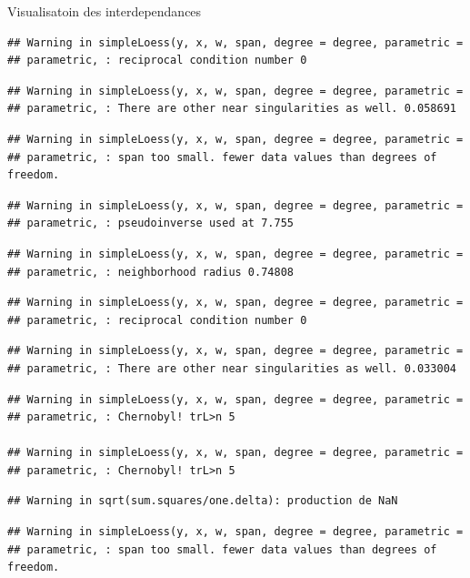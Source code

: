 \documentclass[11pt,ignorenonframetext,]{beamer}
\begin{document}
\begin{frame}[fragile]{Visualisatoin des interdependances}
\begin{verbatim}
## Warning in simpleLoess(y, x, w, span, degree = degree, parametric =
## parametric, : reciprocal condition number 0
\end{verbatim}

\begin{verbatim}
## Warning in simpleLoess(y, x, w, span, degree = degree, parametric =
## parametric, : There are other near singularities as well. 0.058691
\end{verbatim}

\begin{verbatim}
## Warning in simpleLoess(y, x, w, span, degree = degree, parametric =
## parametric, : span too small. fewer data values than degrees of freedom.
\end{verbatim}

\begin{verbatim}
## Warning in simpleLoess(y, x, w, span, degree = degree, parametric =
## parametric, : pseudoinverse used at 7.755
\end{verbatim}

\begin{verbatim}
## Warning in simpleLoess(y, x, w, span, degree = degree, parametric =
## parametric, : neighborhood radius 0.74808
\end{verbatim}

\begin{verbatim}
## Warning in simpleLoess(y, x, w, span, degree = degree, parametric =
## parametric, : reciprocal condition number 0
\end{verbatim}

\begin{verbatim}
## Warning in simpleLoess(y, x, w, span, degree = degree, parametric =
## parametric, : There are other near singularities as well. 0.033004
\end{verbatim}

\begin{verbatim}
## Warning in simpleLoess(y, x, w, span, degree = degree, parametric =
## parametric, : Chernobyl! trL>n 5

## Warning in simpleLoess(y, x, w, span, degree = degree, parametric =
## parametric, : Chernobyl! trL>n 5
\end{verbatim}

\begin{verbatim}
## Warning in sqrt(sum.squares/one.delta): production de NaN
\end{verbatim}

\begin{verbatim}
## Warning in simpleLoess(y, x, w, span, degree = degree, parametric =
## parametric, : span too small. fewer data values than degrees of freedom.
\end{verbatim}


\end{frame}
\end{document}
